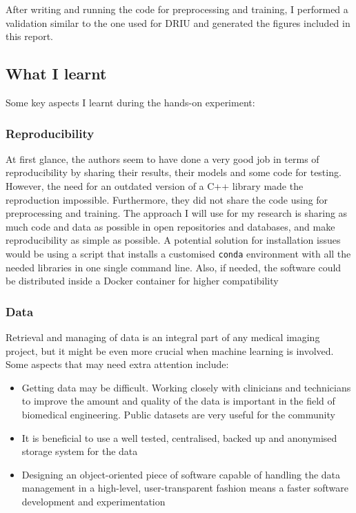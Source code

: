 After writing and running the code for preprocessing and training, I performed a validation similar to the one used for DRIU and generated the figures included in this report.


\subsection{What I learnt}

Some key aspects I learnt during the hands-on experiment:

\subsubsection{Reproducibility}

At first glance, the authors seem to have done a very good job in terms of reproducibility by sharing their results, their models and some code for testing. However, the need for an outdated version of a C++ library made the reproduction impossible. Furthermore, they did not share the code using for preprocessing and training. The approach I will use for my research is sharing as much code and data as possible in open repositories and databases, and make reproducibility as simple as possible. A potential solution for installation issues would be using a script that installs a customised \texttt{conda} \cite{noauthor_conda_nodate} environment with all the needed libraries in one single command line. Also, if needed, the software could be distributed inside a Docker container \cite{noauthor_docker_nodate} for higher compatibility

\subsubsection{Data}
Retrieval and managing of data is an integral part of any medical imaging project, but it might be even more crucial when machine learning is involved. Some aspects that may need extra attention include:
\begin{itemize}
  \item Getting data may be difficult. Working closely with clinicians and technicians to improve the amount and quality of the data is important in the field of biomedical engineering. Public datasets are very useful for the community
  \item It is beneficial to use a well tested, centralised, backed up and anonymised storage system for the data
  \item Designing an object-oriented piece of software capable of handling the data management in a high-level, user-transparent fashion means a faster software development and experimentation
\end{itemize}

